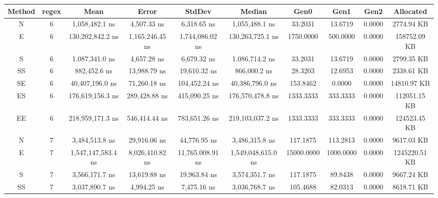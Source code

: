 \begin{sidewaystable}
    \begin{tabular}{|c|c|c|c|c|c|c|c|c|c|}
        \hline
        Method & regex & Mean                & Error             & StdDev              & Median              & Gen0        & Gen1      & Gen2      & Allocated     \\
        \hline
        N      & 6     & 1,058,482.1 ns      & 4,507.33 ns       & 6,318.65 ns         & 1,055,488.1 ns      & 33.2031     & 13.6719   & 0.0000    & 2774.94 KB    \\
        E      & 6     & 130,202,842.2 ns    & 1,165,246.45 ns   & 1,744,086.02 ns     & 130,263,725.1 ns    & 1750.0000   & 500.0000  & 0.0000    & 158752.09 KB  \\
        S      & 6     & 1,087,341.0 ns      & 4,657.28 ns       & 6,679.32 ns         & 1,086,714.2 ns      & 33.2031     & 13.6719   & 0.0000    & 2799.35 KB    \\
        SS     & 6     & 882,452.6 ns        & 13,988.79 ns      & 19,610.32 ns        & 866,000.2 ns        & 28.3203     & 12.6953   & 0.0000    & 2338.61 KB    \\
        SE     & 6     & 40,407,196.0 ns     & 71,260.18 ns      & 104,452.24 ns       & 40,386,796.0 ns     & 153.8462    & 0.0000    & 0.0000    & 14810.97 KB   \\
        ES     & 6     & 176,619,156.3 ns    & 289,428.88 ns     & 415,090.25 ns       & 176,570,478.8 ns    & 1333.3333   & 333.3333  & 0.0000    & 112051.15 KB  \\
        EE     & 6     & 218,959,171.3 ns    & 546,414.44 ns     & 783,651.26 ns       & 219,103,037.2 ns    & 1333.3333   & 333.3333  & 0.0000    & 124523.45 KB  \\
        N      & 7     & 3,484,513.8 ns      & 29,916.06 ns      & 44,776.95 ns        & 3,486,315.8 ns      & 117.1875    & 113.2813  & 0.0000    & 9617.03 KB    \\
        E      & 7     & 1,547,147,583.4 ns  & 8,026,410.82 ns   & 11,765,008.91 ns    & 1,549,048,615.0 ns  & 15000.0000  & 1000.0000 & 0.0000    & 1245220.51 KB \\
        S      & 7     & 3,566,171.7 ns      & 13,619.88 ns      & 19,963.84 ns        & 3,574,351.7 ns      & 117.1875    & 89.8438   & 0.0000    & 9667.24 KB    \\
        SS     & 7     & 3,037,890.7 ns      & 4,994.25 ns       & 7,475.16 ns         & 3,036,768.7 ns      & 105.4688    & 82.0313   & 0.0000    & 8618.71 KB    \\

\end{tabular}
\end{sidewaystable}
